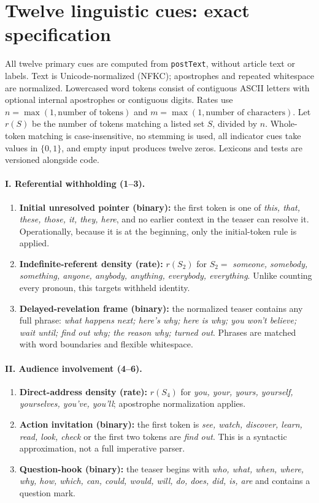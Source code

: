 \documentclass[11pt]{article}
\begin{document}
\appendix
\sloppy
\section{Twelve linguistic cues: exact specification}\label{app:cues}
All twelve primary cues are computed from \texttt{postText}, without article text or labels. Text is Unicode-normalized (NFKC); apostrophes and repeated whitespace are normalized. Lowercased word tokens consist of contiguous ASCII letters with optional internal apostrophes or contiguous digits. Rates use $n=\max(1,\text{number of tokens})$ and $m=\max(1,\text{number of characters})$. Let $r(S)$ be the number of tokens matching a listed set $S$, divided by $n$. Whole-token matching is case-insensitive, no stemming is used, all indicator cues take values in $\{0,1\}$, and empty input produces twelve zeros. Lexicons and tests are versioned alongside code.

\paragraph{I. Referential withholding (1--3).}
\begin{enumerate}[leftmargin=*,itemsep=2pt,topsep=2pt]
\item \textbf{Initial unresolved pointer (binary):} the first token is one of \emph{this, that, these, those, it, they, here}, and no earlier context in the teaser can resolve it. Operationally, because it is at the beginning, only the initial-token rule is applied.
\item \textbf{Indefinite-referent density (rate):} $r(S_2)$ for $S_2=$ \emph{someone, somebody, something, anyone, anybody, anything, everybody, everything}. Unlike counting every pronoun, this targets withheld identity.
\item \textbf{Delayed-revelation frame (binary):} the normalized teaser contains any full phrase: \emph{what happens next; here's why; here is why; you won't believe; wait until; find out why; the reason why; turned out}. Phrases are matched with word boundaries and flexible whitespace.
\end{enumerate}

\paragraph{II. Audience involvement (4--6).}
\begin{enumerate}[leftmargin=*,start=4,itemsep=2pt,topsep=2pt]
\item \textbf{Direct-address density (rate):} $r(S_4)$ for \emph{you, your, yours, yourself, yourselves, you've, you'll}; apostrophe normalization applies.
\item \textbf{Action invitation (binary):} the first token is \emph{see, watch, discover, learn, read, look, check} or the first two tokens are \emph{find out}. This is a syntactic approximation, not a full imperative parser.
\item \textbf{Question-hook (binary):} the teaser begins with \emph{who, what, when, where, why, how, which, can, could, would, will, do, does, did, is, are} and contains a question mark.
\end{enumerate}
\end{document}
